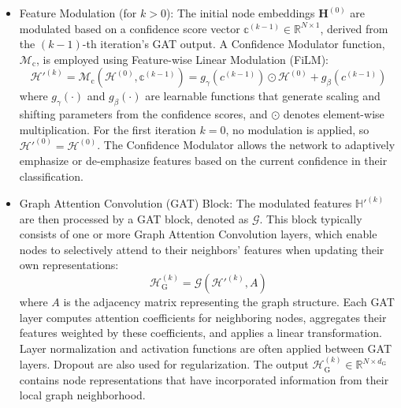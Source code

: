 \begin{itemize}
  \item Feature Modulation (for \(k > 0\)):
    The initial node embeddings \(\mathbf{H}^{(0)}\) are modulated based on a confidence score vector \(\mathbb{c}^{(k-1)} \in \mathbb{R}^{N \times 1}\), derived from the \((k-1)\)-th iteration's GAT output. A Confidence Modulator function, \(\mathcal{M}_{\text{c}}\), is employed using Feature-wise Linear Modulation (FiLM):
    \begin{equation}
      \mathcal{H}'^{(k)} = \mathcal{M}_{\text{c}}(\mathcal{H}^{(0)}, \mathbb{c}^{(k-1)}) = g_{\gamma}(c^{(k-1)}) \odot \mathcal{H}^{(0)} + g_{\beta}(c^{(k-1)})
    \end{equation}
    where \(g_{\gamma}(\cdot)\) and \(g_{\beta}(\cdot)\) are learnable functions that generate scaling and shifting parameters from the confidence scores, and \(\odot\) denotes element-wise multiplication. For the first iteration \(k=0\), no modulation is applied, so \(\mathcal{H}'^{(0)} = \mathcal{H}^{(0)}\). The Confidence Modulator allows the network to adaptively emphasize or de-emphasize features based on the current confidence in their classification.

  \item Graph Attention Convolution (GAT) Block:
    The modulated features \(\mathbb{H}'^{(k)}\) are then processed by a GAT block, denoted as \(\mathcal{G}\). This block typically consists of one or more Graph Attention Convolution layers, which enable nodes to selectively attend to their neighbors' features when updating their own representations:
    \begin{equation}
      \mathcal{H}_{\text{G}}^{(k)} = \mathcal{G}(\mathcal{H}'^{(k)}, A)
    \end{equation}
    where \(A\) is the adjacency matrix representing the graph structure. Each GAT layer computes attention coefficients for neighboring nodes, aggregates their features weighted by these coefficients, and applies a linear transformation. Layer normalization and activation functions  are often applied between GAT layers. Dropout are also used for regularization. The output \(\mathcal{H}_{\text{G}}^{(k)} \in \mathbb{R}^{N \times d_{\text{G}}}\) contains node representations that have incorporated information from their local graph neighborhood.


\end{itemize}
